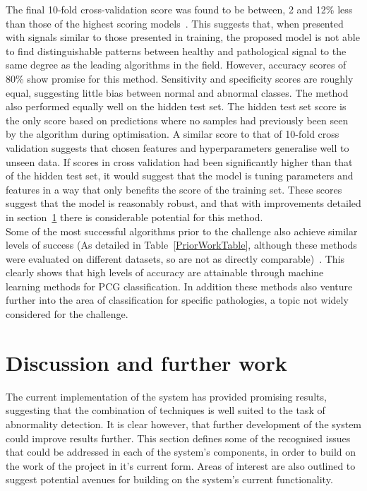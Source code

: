 \documentclass[titlepage, 12pt]{scrartcl} \usepackage{enumitem}
\begin{document}
The final 10-fold cross-validation score was found to be between, 2 and 12\%
less than those of the highest scoring models~\parencite{Zabihi2016, Homsi2017,
Kay2017}. This suggests that, when presented with signals similar to those
presented in training, the proposed model is not able to find distinguishable
patterns between healthy and pathological signal to the same degree as the
leading algorithms in the field. However, accuracy scores of 80\% show promise
for this method. Sensitivity and specificity scores are roughly equal,
suggesting little bias between normal and abnormal classes. The method also
performed equally well on the hidden test set.  The hidden test set score is
the only score based on predictions where no samples had previously been seen
by the algorithm during optimisation. A similar score to that of 10-fold cross
validation suggests that chosen features and hyperparameters generalise well to
unseen data. If scores in cross validation had been significantly higher than
that of the hidden test set, it would suggest that the model is tuning
parameters and features in a way that only benefits the score of the training
set. These scores suggest that the model is reasonably robust, and that with
improvements detailed in section~\ref{FutureWork} there is considerable
potential for this method.\\

Some of the most successful algorithms prior to the challenge also achieve
similar levels of success (As detailed in Table~\ref{PriorWorkTable}, although
these methods were evaluated on different datasets, so are not as directly
comparable)~\parencite{Ari2010, Quiceno-Manrique2010a, Maglogiannis2009}. This
clearly shows that high levels of accuracy are attainable through machine
learning methods for PCG classification. In addition these methods also venture
further into the area of classification for specific pathologies, a topic not
widely considered for the challenge. 


\section{Discussion and further work}\label{FutureWork}
The current implementation of the system has provided promising results,
suggesting that the combination of techniques is well suited to the task of
abnormality detection. It is clear however, that further development of the
system could improve results further. This section defines some of the
recognised issues that could be addressed in each of the system's components,
in order to build on the work of the project in it's current form. Areas of
interest are also outlined to suggest potential avenues for building on the
system's current functionality.\\
\end{document}
